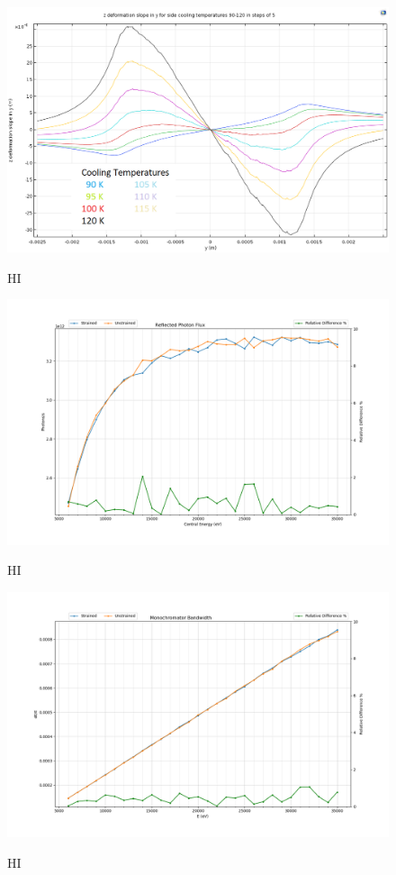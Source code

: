 \documentclass[preprint]{iucr}              %
\begin{document}
\begin{figure}
\caption{HI}
\includegraphics{images/slope.png}
\label{fig:yslope}
\end{figure}

\begin{figure}
\caption{HI}
\includegraphics{images/111flux.png}
\label{fig:111flux}
\end{figure}

\begin{figure}
\caption{HI}
\includegraphics{images/111monobw.png}
\label{fig:111monobw}
\end{figure}
\end{document}
